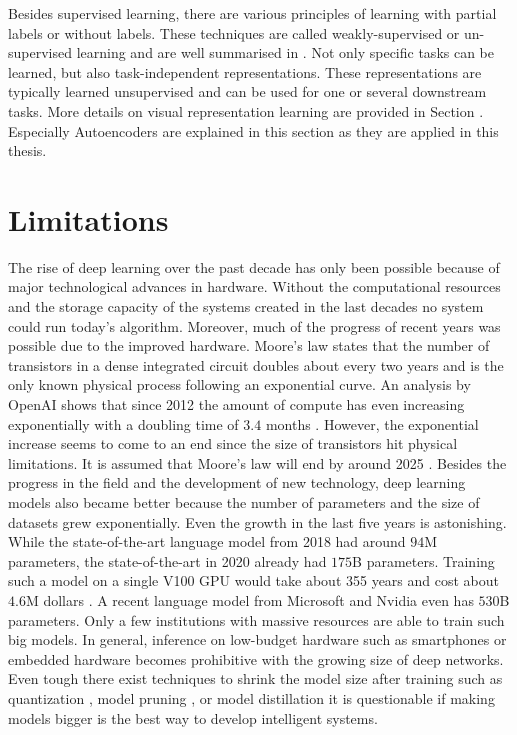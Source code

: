 Besides supervised learning, there are various principles of learning with partial labels or without labels.
These techniques are called weakly-supervised or un-supervised learning and are well summarised in .
Not only specific tasks can be learned, but also task-independent representations.
These representations are typically learned unsupervised and can be used for one or several downstream tasks.
More details on visual representation learning are provided in Section .
Especially Autoencoders  are explained in this section as they are applied in this thesis.


\section{Limitations}
The rise of deep learning over the past decade has only been possible because of major technological advances in hardware.
Without the computational resources and the storage capacity of the systems created in the last decades no system could run today's algorithm.
Moreover, much of the progress of recent years was possible due to the improved hardware. 
Moore’s law \cite{Moore_2006} states that the number of transistors in a dense integrated circuit doubles about every two years and is the only known physical process following an exponential curve.
An analysis by OpenAI shows that since 2012 the amount of compute has even increasing exponentially with a doubling time  of \(3.4\) months \cite{OpenAI_compute}.
However, the exponential increase seems to come to an end since the size of transistors hit physical limitations.
It is assumed that Moore's law will end by around 2025 .
Besides the progress in the field and the development of new technology, deep learning models also became better because the number of parameters and the size of datasets grew exponentially.
Even the growth in the last five years is astonishing.
While the state-of-the-art language model from 2018  had around \(94\)M parameters, the state-of-the-art in 2020  already had \(175\)B parameters. Training such a model on a single V100 GPU would take about 355 years and cost about \(4.6\)M dollars \cite{Lambda_GPT3}.
A recent language model from Microsoft and Nvidia  even has \(530\)B parameters.
Only a few institutions with massive resources are able to train such big models.
In general, inference on low-budget hardware such as smartphones or embedded hardware becomes prohibitive with the growing size of deep networks.
Even tough there exist techniques to shrink the model size after training such as quantization \cite{Wu_Judd_Zhang_Isaev_Micikevicius_2020}, model pruning \cite{Choudhary_Mishra_Goswami_Sarangapani_2020}, or model distillation \cite{Hinton_Vinyals_Dean_2015} it is questionable if making models bigger is the best way to develop intelligent systems.

